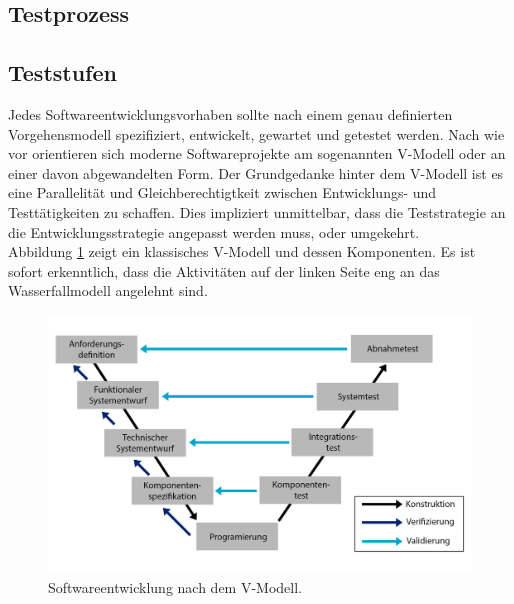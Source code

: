 \subsection{Testprozess}

\subsection{Teststufen}
\label{sec:teststufen}
Jedes Softwareentwicklungsvorhaben sollte nach einem genau definierten Vorgehensmodell spezifiziert, entwickelt, gewartet und getestet werden\cite{spillner_basiswissen_2012}. Nach wie vor orientieren sich moderne Softwareprojekte am sogenannten V-Modell\cite{boehm_verifying_1984} oder an einer davon abgewandelten Form. Der Grundgedanke hinter dem V-Modell ist es eine Parallelität und Gleichberechtigtkeit zwischen Entwicklungs- und Testtätigkeiten zu schaffen. Dies impliziert unmittelbar, dass die Teststrategie an die Entwicklungsstrategie angepasst werden muss, oder umgekehrt.\\

Abbildung \ref{fig:v_modell} zeigt ein klassisches V-Modell und dessen Komponenten. Es ist sofort erkenntlich, dass die Aktivitäten auf der linken Seite eng an das Wasserfallmodell   angelehnt sind.

\begin{figure}[h] 
  \centering
     \includegraphics[width=1\textwidth]{figures/v_modell.png}
  \caption{Softwareentwicklung nach dem V-Modell.}
  \label{fig:v_modell}
\end{figure}



